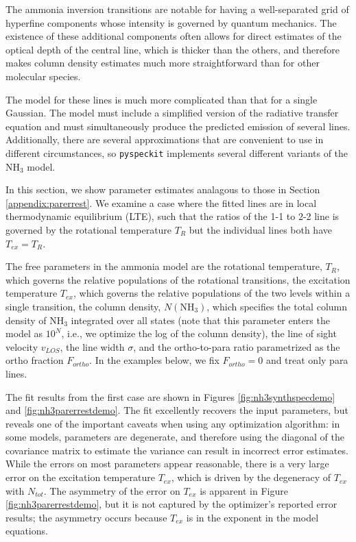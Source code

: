 \documentclass[twocolumn]{aastex62}
\newcommand{\pyspeckit}{\texttt{pyspeckit}\xspace}
\newcommand{\ammonia}{\ensuremath{\mathrm{NH}_3}\xspace}
\begin{document}
The ammonia inversion transitions are notable for having a well-separated grid
of hyperfine components whose intensity is governed by quantum mechanics.
The existence of these additional components often allows for direct estimates
of the optical depth of the central line, which is thicker than the others,
and therefore makes column density estimates much more straightforward than
for other molecular species.

The model for these lines is much more complicated than that for a single Gaussian.
The model must include a simplified version of the radiative transfer equation
and must simultaneously produce the predicted emission of several lines.
Additionally, there are several approximations that are convenient to use
in different circumstances, so \pyspeckit implements several different
variants of the \ammonia model.

In this section, we show parameter estimates analagous to those in Section
\ref{appendix:parerrest}.
We examine a case where the fitted lines are in local
thermodynamic equilibrium (LTE), such that the ratios of the 1-1
to 2-2 line is governed by the rotational temperature $T_{R}$ but the individual
lines both have $T_{ex}=T_{R}$.

The free parameters in the ammonia model are
the rotational temperature, $T_{R}$, which governs the relative populations
of the rotational transitions, the excitation temperature $T_{ex}$, which governs
the relative populations of the two levels within a single transition,
the column density, $N(\ammonia)$, which specifies the total column density
of \ammonia integrated over all states (note that this parameter enters
the model as $10^N$, i.e., we optimize the log of the column density),
the line of sight velocity $v_{LOS}$, the line width $\sigma$, and the ortho-to-para
ratio parametrized as the ortho fraction $F_{ortho}$.  In the examples below,
we fix $F_{ortho}=0$ and treat only para lines.


The fit results from the first case are shown in Figures
\ref{fig:nh3synthspecdemo} and \ref{fig:nh3parerrestdemo}.  The fit excellently
recovers the input parameters, but reveals one of the important caveats when
using any optimization algorithm: in some models, parameters are degenerate,
and therefore using the diagonal of the covariance matrix to estimate the
variance can result in incorrect error estimates.  While the errors on most
parameters appear reasonable, there is a very large error on the excitation
temperature $T_{ex}$, which is driven by the degeneracy of $T_{ex}$ with
$N_{tot}$.  The asymmetry of the error on $T_{ex}$ is apparent in Figure
\ref{fig:nh3parerrestdemo}, but it is not captured by the optimizer's reported
error results; the asymmetry occurs because $T_{ex}$ is in the exponent in the
model equations.
\end{document}

